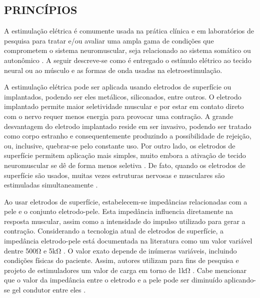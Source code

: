 \subsection{PRINCÍPIOS}

A estimulação elétrica é comumente usada na prática clínica e em laboratórios de pesquisa para tratar e/ou avaliar uma ampla gama de condições que comprometem o sistema neuromuscular, seja relacionado ao sistema somático ou autonômico \cite{Fernando2017ARevisao}. A seguir descreve-se como é entregado o estímulo elétrico ao tecido neural ou ao músculo e as formas de onda usadas na eletroestimulação.

A estimulação elétrica pode ser aplicada usando eletrodos de superfície ou implantados, podendo ser eles metálicos, siliconados, entre outros. O eletrodo implantado permite maior seletividade muscular e por estar em contato direto com o nervo requer menos energia para provocar uma contração. A grande desvantagem do eletrodo implantado reside em ser invasivo, podendo ser tratado como corpo estranho e consequentemente produzindo a possibilidade de rejeição, ou, inclusive, quebrar-se pelo constante uso. Por outro lado, os eletrodos de superfície permitem aplicação mais simples, muito embora a ativação de tecido neuromuscular se dê de forma menos seletiva \cite{Popovic2000ControlDisabled}. De fato, quando os eletrodos de superfície são usados, muitas vezes estruturas nervosas e musculares são estimuladas simultaneamente \cite{Linares2004BibliographicalCuadriceps}. 

Ao usar eletrodos de superfície, estabelecem-se impedâncias relacionadas com a pele e o conjunto eletrodo-pele. Esta impedância influencia diretamente na resposta muscular, assim como a intensidade do impulso utilizado para gerar a contração. Considerando a tecnologia atual de eletrodos de superfície, a impedância eletrodo-pele está documentada na literatura como um valor variável dentre 500$\mathrm{\Omega}$ e 5k$\mathrm{\Omega}$ \cite{Wu2002AApplications}. O valor exato depende de inúmeras variáveis, incluindo condições físicas do paciente. Assim, autores utilizam para fins de pesquisa e projeto de estimuladores um valor de carga em torno de 1k$\mathrm{\Omega}$ \cite{Zanotti2003PeripheralStimulation, Maffiuletti2011ElectricalIssues}. Cabe mencionar que o valor da impedância entre o eletrodo e a pele pode ser diminuído aplicando-se gel condutor entre eles \cite{Faria2006ImplementacaoMedulares}. 

